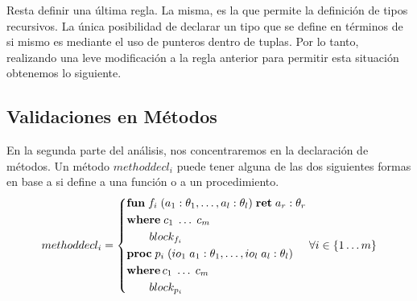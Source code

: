 \documentclass{article}
\begin{document}
\begin{prooftree}
\end{prooftree}

Resta definir una última regla.
La misma, es la que permite la definición de tipos recursivos.
La única posibilidad de declarar un tipo que se define en términos de si mismo es mediante el uso de punteros dentro de tuplas.
Por lo tanto, realizando una leve modificación a la regla anterior para permitir esta situación obtenemos lo siguiente.

\begin{prooftree}
\end{prooftree}

\subsection{Validaciones en Métodos}

En la segunda parte del análisis, nos concentraremos en la declaración de métodos.
Un método $methoddecl_i$ puede tener alguna de las dos siguientes formas en base a si define a una función o a un procedimiento.
\begin{gather*}
methoddecl_i =
\begin{cases*}
\T{fun} \; f_i \; (a_1: \theta_1, \ldots, a_l: \theta_l) \; \T{ret} \; a_r: \theta_r
\\
\T{where} \; c_1 \; \ldots \; c_m
\\
\qquad block_{f_i}
\\
\T{proc} \; p_i \; (io_1 \; a_1: \theta_1, \ldots, io_l \; a_l: \theta_l)
\\
\T{where} \, c_1 \; \ldots \; c_m
\\
\qquad block_{p_i}
\end{cases*}
\forall i \in \{ 1 \ldots m \}
\end{gather*}
\end{document}
